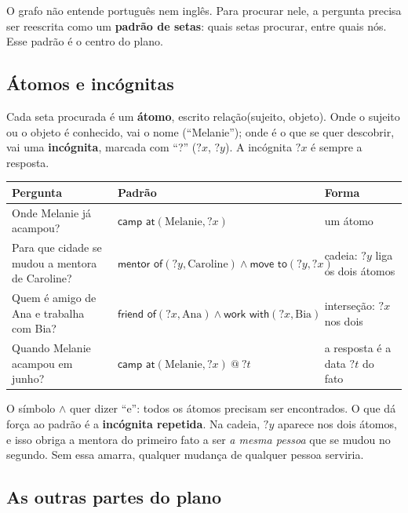 \documentclass[11pt]{article}
\newcommand{\rel}[1]{\textsf{#1}}
\newcommand{\V}[1]{\mathord{?}\mathit{#1}}
\begin{document}
O grafo não entende português nem inglês. Para procurar nele, a pergunta
precisa ser reescrita como um \textbf{padrão de setas}: quais setas procurar,
entre quais nós. Esse padrão é o centro do plano.

\subsection{Átomos e incógnitas}

Cada seta procurada é um \textbf{átomo}, escrito
\rel{relação}(sujeito, objeto). Onde o sujeito ou o objeto é conhecido, vai o
nome (``Melanie''); onde é o que se quer descobrir, vai uma \textbf{incógnita},
marcada com ``?'' ($\V x$, $\V y$). A incógnita $\V x$ é sempre a resposta.

\begin{center}\small
\begin{tabularx}{\textwidth}{@{}>{\raggedright\arraybackslash}p{4.6cm} l Y@{}}
\toprule
Pergunta & Padrão & Forma \\
\midrule
Onde Melanie já acampou? & $\rel{camp at}(\text{Melanie},\V x)$ & um átomo \\
Para que cidade se mudou a mentora de Caroline? & $\rel{mentor of}(\V y,\text{Caroline})\wedge\rel{move to}(\V y,\V x)$ & cadeia: $\V y$ liga os dois átomos \\
Quem é amigo de Ana e trabalha com Bia? & $\rel{friend of}(\V x,\text{Ana})\wedge\rel{work with}(\V x,\text{Bia})$ & interseção: $\V x$ nos dois \\
Quando Melanie acampou em junho? & $\rel{camp at}(\text{Melanie},\V x)\ @\ \V t$ & a resposta é a data $\V t$ do fato \\
\bottomrule
\end{tabularx}
\end{center}

O símbolo $\wedge$ quer dizer ``e'': todos os átomos precisam ser encontrados.
O que dá força ao padrão é a \textbf{incógnita repetida}. Na cadeia, $\V y$
aparece nos dois átomos, e isso obriga a mentora do primeiro fato a ser
\emph{a mesma pessoa} que se mudou no segundo. Sem essa amarra, qualquer
mudança de qualquer pessoa serviria.

\subsection{As outras partes do plano}
\end{document}
